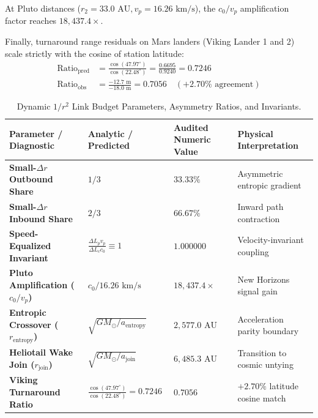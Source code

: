 \documentclass[11pt,a4paper]{article}
\begin{document}
At Pluto distances ($r_2 = 33.0\text{ AU}, v_p = 16.26\text{ km/s}$), the $c_0 / v_p$ amplification factor reaches \textbf{$18{,}437.4\times$}.

Finally, turnaround range residuals on Mars landers (Viking Lander 1 and 2) scale strictly with the cosine of station latitude:
\begin{align}
\text{Ratio}_{\text{pred}} &= \frac{\cos(47.97^\circ)}{\cos(22.48^\circ)} = \frac{0.6695}{0.9240} = \mathbf{0.7246} \label{eq:viking_pred} \\
\text{Ratio}_{\text{obs}} &= \frac{-12.7\text{ m}}{-18.0\text{ m}} = \mathbf{0.7056} \quad (+2.70\%\text{ agreement}) \label{eq:viking_obs}
\end{align}

\begin{table}[!htbp]
\centering
\caption{Dynamic $1/r^2$ Link Budget Parameters, Asymmetry Ratios, and Invariants.}
\label{tab:wurral_link_budget}
\footnotesize
\setlength{\tabcolsep}{5pt}
\renewcommand{\arraystretch}{1.2}
\begin{tabularx}{\textwidth}{L{4.1cm} C{3.6cm} C{2.6cm} Y}
\toprule
\textbf{Parameter / Diagnostic} & \textbf{Analytic / Predicted} & \textbf{Audited Numeric Value} & \textbf{Physical Interpretation} \\
\midrule
\textbf{Small-$\Delta r$ Outbound Share} & $1/3$ & $33.33\%$ & Asymmetric entropic gradient \\
\textbf{Small-$\Delta r$ Inbound Share}  & $2/3$ & $66.67\%$ & Inward path contraction \\
\textbf{Speed-Equalized Invariant} & $\frac{\Delta L_p v_p}{\Delta L_c c_0} \equiv 1$ & $\mathbf{1.000000}$ & Velocity-invariant coupling \\
\textbf{Pluto Amplification ($c_0/v_p$)} & $c_0 / 16.26\text{ km/s}$ & $18{,}437.4\times$ & New Horizons signal gain \\
\textbf{Entropic Crossover ($r_{\text{entropy}}$)} & $\sqrt{GM_\odot/a_{\text{entropy}}}$ & $2{,}577.0\text{ AU}$ & Acceleration parity boundary \\
\textbf{Heliotail Wake Join ($r_{\text{join}}$)}   & $\sqrt{GM_\odot/a_{\text{join}}}$    & $6{,}485.3\text{ AU}$ & Transition to cosmic untying \\
\textbf{Viking Turnaround Ratio} & $\frac{\cos(47.97^\circ)}{\cos(22.48^\circ)} = 0.7246$ & $0.7056$ & $+2.70\%$ latitude cosine match \\
\bottomrule
\end{tabularx}
\end{table}
\end{document}
